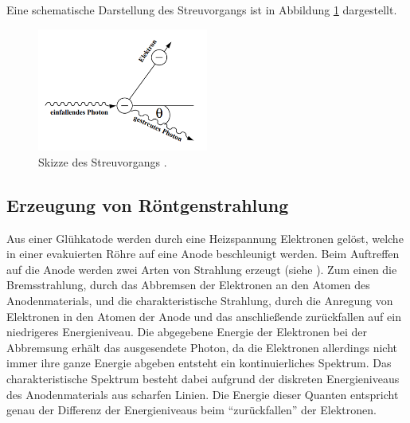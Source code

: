Eine schematische Darstellung des Streuvorgangs ist in Abbildung \ref{fig:comptonstreuungskizze} dargestellt.
\begin{figure}
  \centering
  \includegraphics[width=0.5\textwidth]{bilder/comptonstreuung.png}
  \caption{Skizze des Streuvorgangs \cite{skript3}.}
  \label{fig:comptonstreuungskizze}
\end{figure}
\subsection{Erzeugung von Röntgenstrahlung}
Aus einer Glühkatode werden durch eine Heizspannung Elektronen gelöst, welche in einer evakuierten Röhre auf eine Anode beschleunigt werden. Beim Auftreffen auf die Anode werden
zwei Arten von Strahlung erzeugt (siehe \cite{skript4}). Zum einen die Bremsstrahlung, durch das Abbremsen der Elektronen an den Atomen des Anodenmaterials, und die charakteristische Strahlung, durch die
Anregung von Elektronen in den Atomen der Anode und das anschließende zurückfallen auf ein niedrigeres Energieniveau. Die abgegebene Energie der Elektronen bei der Abbremsung erhält das ausgesendete Photon, da die Elektronen 
allerdings nicht immer ihre ganze Energie abgeben entsteht ein kontinuierliches Spektrum. Das charakteristische Spektrum besteht dabei aufgrund der diskreten Energieniveaus des Anodenmaterials aus scharfen Linien. Die Energie dieser 
Quanten entspricht genau der Differenz der Energieniveaus beim \enquote{zurückfallen} der Elektronen.
